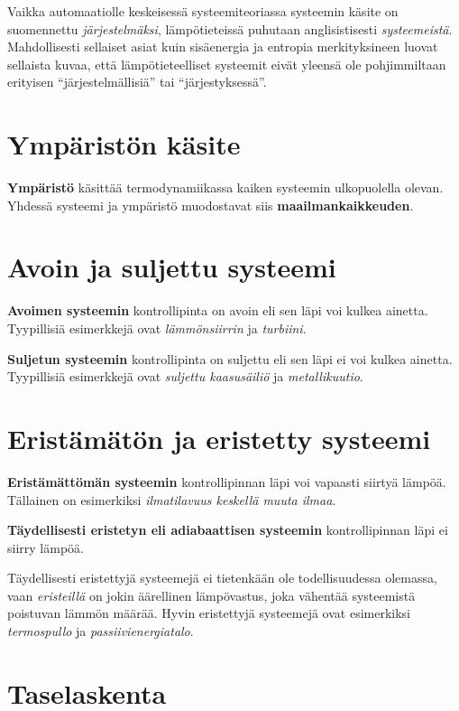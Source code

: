\documentclass[12pt,a4paper,finnish]{book}
\begin{document}
Vaikka automaatiolle keskeisessä systeemiteoriassa systeemin käsite on suomennettu \textit{järjestelmäksi},
lämpötieteissä puhutaan anglisistisesti \textit{systeemeistä}. Mahdollisesti sellaiset asiat kuin 
sisäenergia ja entropia merkityksineen luovat sellaista kuvaa, että lämpötieteelliset systeemit eivät 
yleensä ole pohjimmiltaan erityisen ``järjestelmällisiä'' tai ``järjestyksessä''.

\section{Ympäristön käsite} %

\textbf{Ympäristö} käsittää termodynamiikassa kaiken systeemin ulkopuolella olevan. Yhdessä systeemi ja ympäristö 
muodostavat siis \textbf{maailmankaikkeuden}.

\section{Avoin ja suljettu systeemi} %

\textbf{Avoimen systeemin} kontrollipinta on avoin eli sen läpi voi kulkea ainetta. Tyypillisiä esimerkkejä 
ovat \textit{lämmönsiirrin} ja \textit{turbiini}.

\textbf{Suljetun systeemin} kontrollipinta on suljettu eli sen läpi ei voi kulkea ainetta. Tyypillisiä 
esimerkkejä ovat \textit{suljettu kaasusäiliö} ja \textit{metallikuutio}.

\section{Eristämätön ja eristetty systeemi}%

\textbf{Eristämättömän systeemin} kontrollipinnan läpi voi vapaasti siirtyä lämpöä. 
Tällainen on esimerkiksi \textit{ilmatilavuus keskellä muuta ilmaa}.

\textbf{Täydellisesti eristetyn eli adiabaattisen systeemin} kontrollipinnan läpi ei siirry lämpöä.

Täydellisesti eristettyjä systeemejä ei tietenkään ole todellisuudessa olemassa, vaan \textit{eristeillä} 
on jokin äärellinen lämpövastus, joka vähentää systeemistä poistuvan lämmön määrää. Hyvin eristettyjä 
systeemejä ovat esimerkiksi \textit{termospullo} ja \textit{passiivienergiatalo}.

\section{Taselaskenta} %
\end{document}
